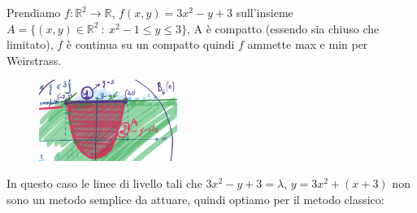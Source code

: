 \begin{example}
Prendiamo $f: \mathbb{R}^2 \to \mathbb{R}$, $f(x,y) = 3x^2 - y + 3$ sull'insieme $A = \{(x,y) \in \mathbb{R}^2 \::\: x^2 - 1 \leq y \leq 3\}$, A è compatto (essendo sia chiuso che limitato), $f$ è continua su un compatto quindi $f$ ammette max e min per Weirstrass.
\end{example}
\begin{figure}
\vspace{-20pt}
    \centering
    \includegraphics[width=4.5cm]{images/ess-max-min-classico-R2.png}
\end{figure}
In questo caso le linee di livello tali che $3x^2 - y + 3 = \lambda$, $y = 3x^2 + (x+3)$ non sono un metodo semplice da attuare, quindi optiamo per il metodo classico:

